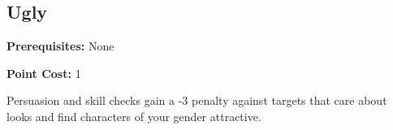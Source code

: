 \subsection*{Ugly}\label{feat:ugly}

\noindent
\textbf{Prerequisites:} None

\noindent
\textbf{Point Cost:} 1 

Persuasion and skill checks gain a -3 penalty against targets that care about
looks and find characters of your gender attractive.
